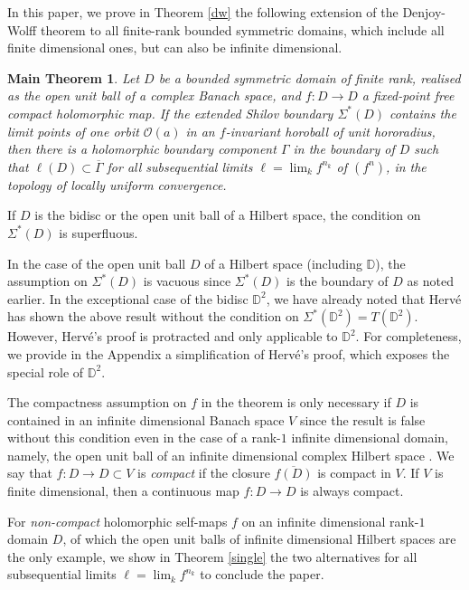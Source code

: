 \documentclass[12pt, twoside]{article}
\theoremstyle{definition}
\newtheorem*{xmainthm}{Main Theorem}
\numberwithin{equation}{section}
\begin{document}
 In this paper, we prove  in Theorem \ref{dw} the following extension of
 the Denjoy-Wolff theorem
 to all finite-rank bounded symmetric domains,
 which include all finite dimensional ones, but can also be infinite dimensional. \\


\begin{xmainthm}
{\it  Let $D$ be a bounded symmetric domain of finite rank, realised as the open unit ball of a complex Banach space, and $f: D
  \longrightarrow D$  a  fixed-point free compact holomorphic map. If the extended Shilov boundary $\Sigma^*(D)$
  contains the limit points of
one orbit $\mathcal{O}(a)$ in an $f$-invariant horoball of unit hororadius,   then
there is a holomorphic boundary component $\Gamma$ in the boundary of $ D$ such that
$\ell(D) \subset \overline \Gamma$ for all subsequential limits $\ell= \lim_k f^{n_k}$ of $(f^n)$,
in the topology of locally uniform convergence.

If $D$ is the bidisc or the open unit ball of a Hilbert space, the condition on $\Sigma^*(D)$ is superfluous.}
\end{xmainthm}

In the case of the open unit ball $D$ of a Hilbert  space (including $\mathbb{D}$), the assumption on $\Sigma^*({D})$ is vacuous since
 $\Sigma^*({D})$ is the boundary of $D$ as noted earlier. In the exceptional case of the bidisc $\mathbb{D}^2$,
we have already noted that Herv\'e has shown the above result without the condition on $\Sigma^*(\mathbb{D}^2)=T(\mathbb{D}^2)$.
However, Herv\'e's proof is protracted and only applicable to $\mathbb{D}^2$. For completeness, we provide
 in the Appendix a simplification of Herv\'e's proof, which exposes the special role of  $\mathbb{D}^2$.


The compactness assumption on $f$ in the theorem is only necessary if $D$ is contained in
an infinite dimensional Banach space $V$
since the result is false without this condition even in the case of a rank-$1$ infinite dimensional
domain, namely, the open unit ball of an infinite dimensional complex Hilbert space \cite{cm}.
We say that $f: D \longrightarrow D \subset V$ is {\it compact} if the closure $\overline{f(D)}$ is compact
in $V$.
If $V$ is finite dimensional, then a continuous map $f : D \longrightarrow D$ is always compact.

For {\it non-compact} holomorphic self-maps $f$ on an infinite dimensional rank-$1$ domain $D$, of which the
open unit balls of infinite dimensional Hilbert spaces are the only example,
we show in Theorem \ref{single} the two alternatives for all subsequential limits  $\ell= \lim_k f^{n_k}$  to conclude the paper.
\end{document}
